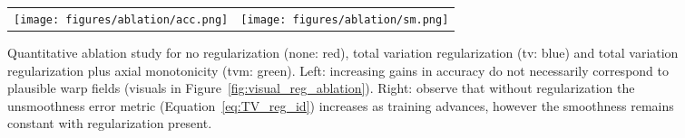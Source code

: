 \documentclass[acmtog,timestamp]{acmart}%
\newcommand{\jsubfig}[2]{%
	\sbox\jsavebox{#1}%
	\parbox[t]{\wd\jsavebox}{\centering\usebox\jsavebox\\#2}%
	}
\begin{document}
\begin{figure}
\newcommand{\sfig}{3.1}
\setlength\tabcolsep{2pt}
\begin{tabular}{ c c }
\texttt{[image: figures/ablation/acc.png]} &
\texttt{[image: figures/ablation/sm.png]} \\
\end{tabular} 
\caption{Quantitative ablation study for no regularization (none: red), total variation regularization (tv: blue) and total variation regularization plus axial monotonicity (tvm: green). Left: increasing gains in accuracy do not necessarily correspond to plausible warp fields (visuals in Figure~\ref{fig:visual_reg_ablation}). Right: observe that without regularization the unsmoothness error metric (Equation~\ref{eq:TV_reg_id}) increases as training advances, however the smoothness remains constant with regularization present.}
\label{fig:itr_reg_plot}
\end{figure}\begin{comment}
\centering
	\newcommand{\mysize}{3.1}
    
    \jsubfig{\texttt{[image: \{figures/ablation/acc.png]}}}{}%
	\hfill \jsubfig{\texttt{[image: figures/ablation/sm.png]}}{}
   
   
    
    
    
\end{comment}%
\end{document}
